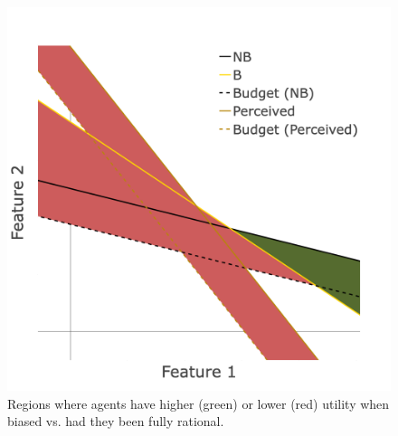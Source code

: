 \begin{figure}[ht]
    \centering
    \includegraphics[width=0.6\linewidth]{Figures/SW_highlighted regions.png}
    \caption{Regions where agents have higher (green) or lower (red) utility when biased vs. had they been fully rational.}
    \label{fig:SW-regions}
\end{figure}




